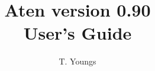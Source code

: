 \documentclass[a4paper,10pt]{report}
\begin{document}
\newenvironment{optlist}[1]
  {
    \begin{flushleft}\textbf{#1}\end{flushleft}
    \begin{list}{}{}
  }
  { \end{list} }

\newcommand{\progname}{{\sffamily Aten}}
\newcommand{\qte}[1]{\lq{}#1\rq{}}
\newcommand{\ttqte}[1]{\lq{}{\ttfamily#1}\rq{}}
\newcommand{\dqte}[1]{``#1''}
\newcommand{\its}{\hspace{20cm}}

\title{\progname{} version 0.90 \\ User's Guide}
\author{T. Youngs}
\maketitle

\tableofcontents












\printindex
\end{document}
